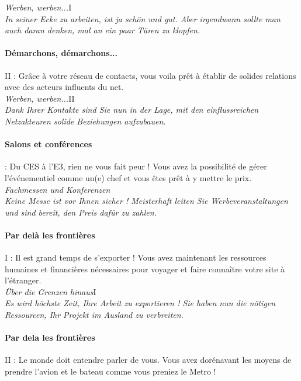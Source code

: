\documentclass[10pt,a4paper]{article}
\begin{document}
\textit{Werben, werben...}I\\
\textit{In seiner Ecke zu arbeiten, ist ja schön und gut. Aber irgendwann sollte man auch daran denken, mal an ein paar Türen zu klopfen.}


\paragraph{Démarchons, démarchons...} II : Grâce à votre réseau de contacts, vous voila prêt à établir de solides relations avec des acteurs influents du net.\\

\textit{Werben, werben...}II\\
\textit{Dank Ihrer Kontakte sind Sie nun in der Lage, mit den einflussreichen Netzakteuren solide Beziehungen aufzubauen.}


\paragraph{Salons et conférences} : Du CES à l'E3, rien ne vous fait peur ! Vous avez la possibilité de gérer l'événementiel comme un(e) chef et vous êtes prêt à y mettre le prix.\\

\textit{Fachmessen und Konferenzen}\\
\textit{Keine Messe ist vor Ihnen sicher ! Meisterhaft leiten Sie Werbeveranstaltungen und sind bereit, den Preis dafür zu zahlen.}


\paragraph{Par delà les frontières} I : Il est grand temps de s'exporter ! Vous avez maintenant les ressources humaines et financières nécessaires pour voyager et faire connaître votre site à l'étranger.\\

\textit{Über die Grenzen hinaus}I\\
\textit{Es wird höchste Zeit, Ihre Arbeit zu exportieren ! Sie haben nun die nötigen Ressourcen, Ihr Projekt im Ausland zu verbreiten.}


\paragraph{Par dela les frontières} II : Le monde doit entendre parler de vous. Vous avez dorénavant les moyens de prendre l'avion et le bateau comme vous preniez le Metro !\\
\end{document}

